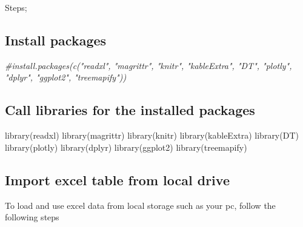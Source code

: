 \documentclass[
]{book}
\newenvironment{Shaded}{\begin{snugshade}}{\end{snugshade}}
\newcommand{\CommentTok}[1]{\textcolor[rgb]{0.56,0.35,0.01}{\textit{#1}}}
\newcommand{\FunctionTok}[1]{\textcolor[rgb]{0.00,0.00,0.00}{#1}}
\newcommand{\NormalTok}[1]{#1}
\begin{document}
Steps;

\hypertarget{install-packages}{%
\subsection{Install packages}\label{install-packages}}

\begin{Shaded}
\begin{Highlighting}[]
\CommentTok{\#install.packages(c("readxl", "magrittr", "knitr", "kableExtra", "DT", "plotly", "dplyr", "ggplot2", "treemapify"))}
\end{Highlighting}
\end{Shaded}

\hypertarget{call-libraries-for-the-installed-packages}{%
\subsection{Call libraries for the installed packages}\label{call-libraries-for-the-installed-packages}}

\begin{Shaded}
\begin{Highlighting}[]
\FunctionTok{library}\NormalTok{(readxl)}
\FunctionTok{library}\NormalTok{(magrittr)}
\FunctionTok{library}\NormalTok{(knitr)}
\FunctionTok{library}\NormalTok{(kableExtra)}
\FunctionTok{library}\NormalTok{(DT)}
\FunctionTok{library}\NormalTok{(plotly)}
\FunctionTok{library}\NormalTok{(dplyr)}
\FunctionTok{library}\NormalTok{(ggplot2)}
\FunctionTok{library}\NormalTok{(treemapify)}
\end{Highlighting}
\end{Shaded}

\hypertarget{import-excel-table-from-local-drive}{%
\subsection{Import excel table from local drive}\label{import-excel-table-from-local-drive}}

To load and use excel data from local storage such as your pc, follow the following steps
\end{document}
